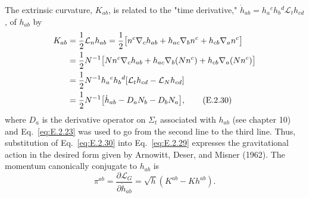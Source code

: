 The extrinsic curvature, \(K_{ab}\), is related to the "time derivative,"
\(\dot h_{ab}=h_a{}^ch_b{}^d\mathcal L_t h_{cd}\), of \(h_{ab}\) by
\begin{align}
  K_{ab}
    &=\frac{1}{2}\mathcal L_nh_{ab}
      =\frac{1}{2}\bigl[n^c\nabla_ch_{ab}
        +h_{ac}\nabla_bn^c+h_{cb}\nabla_an^c\bigr]\notag\\
    &=\frac{1}{2}N^{-1}\bigl[Nn^c\nabla_ch_{ab}
        +h_{ac}\nabla_b(Nn^c)+h_{cb}\nabla_a(Nn^c)\bigr]\notag\\
    &=\frac{1}{2}N^{-1}h_a{}^ch_b{}^d
      [\mathcal L_t h_{cd}-\mathcal L_Nh_{cd}]\notag\\
    &=\frac{1}{2}N^{-1}\bigl[\dot h_{ab}-D_aN_b-D_bN_a\bigr],
  \tag{E.2.30}\label{eq:E.2.30}
\end{align}
where \(D_a\) is the derivative operator on \(\Sigma_t\) associated with \(h_{ab}\)
(see chapter 10) and Eq.~\eqref{eq:E.2.23} was used to go from the second line to
the third line. Thus, substitution of Eq.~\eqref{eq:E.2.30} into
Eq.~\eqref{eq:E.2.29} expresses the gravitational action in the desired form given
by Arnowitt, Deser, and Misner (1962). The momentum canonically conjugate to
\(h_{ab}\) is
\begin{equation}
  \pi^{ab}=\frac{\partial\mathcal L_G}{\partial\dot h_{ab}}
    =\sqrt{h}(K^{ab}-Kh^{ab}).
  \tag{E.2.31}\label{eq:E.2.31}
\end{equation}

